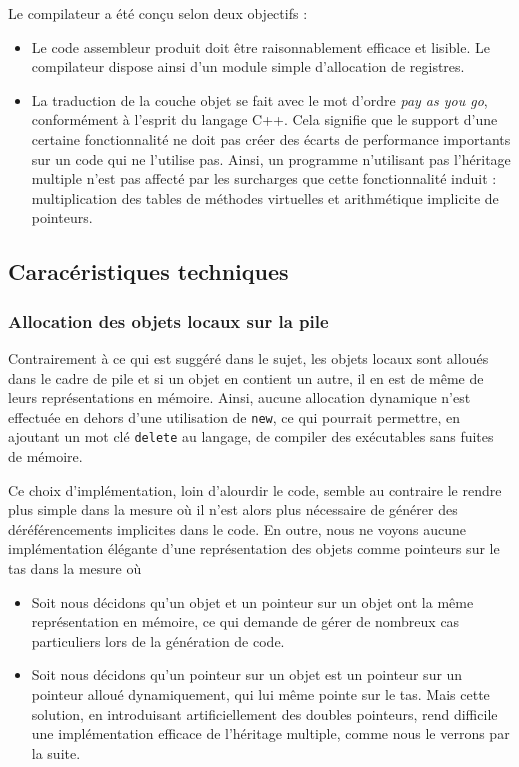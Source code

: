 \documentclass[11pt, a4paper]{article}
\newcommand{\prog}[1]{{\tt#1}}
\begin{document}
Le compilateur a été conçu selon deux objectifs : \medskip

\begin{itemize}
\item Le code assembleur produit doit être raisonnablement efficace et lisible. Le compilateur dispose ainsi d'un module simple d'allocation de registres. \medskip
\item La traduction de la couche objet se fait avec le mot d'ordre \textit{pay as you go}, conformément à l'esprit du langage C++. Cela signifie que le support d'une certaine fonctionnalité ne doit pas créer des écarts de performance importants sur un code qui ne l'utilise pas. Ainsi, un programme n'utilisant pas l'héritage multiple n'est pas affecté par les surcharges que cette fonctionnalité induit : multiplication des tables de méthodes virtuelles et arithmétique implicite de pointeurs.

\end{itemize}

\bigskip

\subsection{Caracéristiques techniques}

\subsubsection{Allocation des objets locaux sur la pile}

Contrairement à ce qui est suggéré dans le sujet, les objets locaux sont alloués dans le cadre de pile et si un objet en contient un autre, il en est de même de leurs représentations en mémoire. Ainsi, aucune allocation dynamique n'est effectuée en dehors d'une utilisation de \prog{new}, ce qui pourrait permettre, en ajoutant un mot clé \prog{delete} au langage, de compiler des exécutables sans fuites de mémoire.

Ce choix d'implémentation, loin d'alourdir le code, semble au contraire le rendre plus simple dans la mesure où il n'est alors plus nécessaire de générer des déréférencements implicites dans le code. En outre, nous ne voyons aucune implémentation élégante d'une représentation des objets comme pointeurs sur le tas dans la mesure où

\medskip

\begin{itemize}
\item Soit nous décidons qu'un objet et un pointeur sur un objet ont la même représentation en mémoire, ce qui demande de gérer de nombreux cas particuliers lors de la génération de code.
\item Soit nous décidons qu'un pointeur sur un objet est un pointeur sur un pointeur alloué dynamiquement, qui lui même pointe sur le tas. Mais cette solution, en introduisant artificiellement des doubles pointeurs, rend difficile une implémentation efficace de l'héritage multiple, comme nous le verrons par la suite.
\end{itemize}
\end{document}
